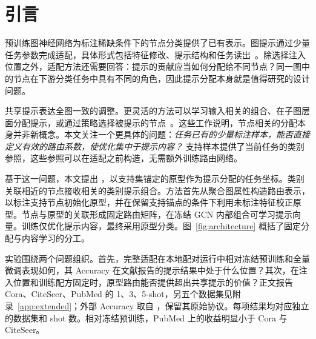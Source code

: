 \begin{abstract}
本文提出原型路由图提示方法 \method，利用支持集原型将可学习提示分配给不同节点。在每类仅有少量标注的条件下，任务适配不仅需要学习提示内容，还需要确定提示应当作用于哪些节点。\method 从聚合节点属性构造类别参照，在保留支持集锚点的同时利用未标注图特征进行校正，并将节点与原型的关联转换为固定路由矩阵。该矩阵组合可学习类别提示，将其注入冻结图卷积编码器，最终采用原型分类。我们在 Cora、CiteSeer、PubMed 上分别评估 1、3、5-shot 设置，按原 ProG 实现抽样，支持与测试节点可能重叠；对各条件使用配对的任务与训练种子。5-shot 下，三个数据集的 Accuracy 分别为 72.87\%、64.70\%、68.34\%；相对同配方共享提示，原型路由在对应条件下分别带来 36.57、39.09、3.34 个百分点的提升。这些逐条件配对结果支持原型关系对提示分配的组织价值，结论限于该含重叠的传导式评估协议。
\end{abstract}

\section{引言}
预训练图神经网络为标注稀缺条件下的节点分类提供了已有表示。图提示通过少量任务参数完成适配，具体形式包括特征修改、提示结构和任务读出~\citep{gppt2022,gpf2023,allinone2023,graphprompt2023}。除选择注入位置之外，适配方法还需要回答：提示的贡献应当如何分配给不同节点？同一图中的节点在下游分类任务中具有不同的角色，因此提示分配本身就是值得研究的设计问题。

共享提示表达全图一致的调整。更灵活的方法可以学习输入相关的组合、在子图层面分配提示，或通过策略选择被提示的节点~\citep{gpf2023,supt2026,relief2025}。这些工作说明，节点相关的分配本身并非新概念。本文关注一个更具体的问题：\emph{任务已有的少量标注样本，能否直接定义有效的路由系数，使优化集中于提示内容？} 支持样本提供了当前任务的类别参照，这些参照可以在适配之前构造，无需额外训练路由网络。

基于这一问题，本文提出 \method，以支持集锚定的原型作为提示分配的任务坐标。类别关联相近的节点接收相关的类别提示组合。方法首先从聚合图属性构造路由表示，以标注支持节点初始化原型，并在保留支持锚点的条件下利用未标注特征校正原型。节点与原型的关联形成固定路由矩阵，在冻结 GCN 内部组合可学习提示向量。训练仅优化提示内容，最终采用原型分类。图~\ref{fig:architecture} 概括了固定分配与内容学习的分工。

实验围绕两个问题组织。首先，完整适配在本地配对运行中相对冻结预训练和全量微调表现如何，其 Accuracy 在文献报告的提示结果中处于什么位置？其次，在注入位置和训练配方固定时，原型路由能否提供超出共享提示的价值？正文报告 Cora、CiteSeer、PubMed 的 1、3、5-shot，另五个数据集见附录~\ref{app:extended}；外部 Accuracy 取自 \citet{mtg2026}，保留其原始协议。每项结果均对应独立的数据集和 shot 数。相对冻结预训练，PubMed 上的收益明显小于 Cora 与 CiteSeer。

